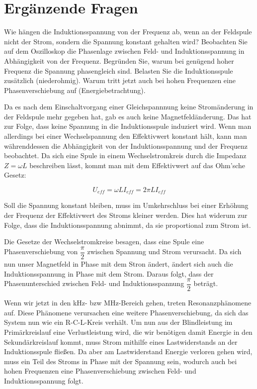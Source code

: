 \documentclass{article}
\begin{document}
\section{Ergänzende Fragen}
Wie hängen die Induktionsspannung von der Frequenz ab, wenn an der Feldspule nicht der Strom, sondern die Spannung konstant gehalten wird?
Beobachten Sie auf dem Oszilloskop die Phasenlage zwischen Feld- und Induktionsspannung in Abhängigkeit von der Frequenz.
Begründen Sie, warum bei genügend hoher Frequenz die Spannung phasengleich sind. Belasten Sie die Induktionsspule zusätzlich (niederohmig). Warum tritt jetzt auch bei hohen Frequenzen eine Phasenverschiebung auf (Energiebetrachtung).

\vspace{1cm}

Da es nach dem Einschaltvorgang einer Gleichspannnung keine Stromänderung in der Feldspule mehr gegeben hat, gab es auch keine Magnetfeldänderung. Das hat zur Folge, dass keine Spannung in die Induktionsspule induziert wird. Wenn man allerdings bei einer Wechselspannung den Effektivwert konstant hält, kann man währenddessen die Abhängigkeit von der Induktionsspannung und der Frequenz beobachtet.
Da sich eine Spule in einem Wechselstromkreis durch die Impedanz $Z=\omega L$ beschreiben lässt, kommt man mit dem Effektivwert auf das Ohm'sche Gesetz:

\begin{equation}
U_{eff}=\omega L I_{eff}=2\pi L I_{eff}
\end{equation}

Soll die Spannung konstant bleiben, muss im Umkehrschluss bei einer Erhöhung der Frequenz der Effektivwert des Stroms kleiner werden. Dies hat widerum zur Folge, dass die Induktionsspannung abnimmt, da sie proportional zum Strom ist.

Die Gesetze der Wechselstromkreise besagen, dass eine Spule eine Phasenverschiebung von $\dfrac{\pi}{2}$ zwischen Spannung und Strom verursacht. Da sich nun unser Magnetfeld in Phase mit dem Stron ändert, ändert sich auch die Induktionsspannung in Phase mit dem Strom. Daraus folgt, dass der Phasenunterschied zwischen Feld- und Induktionsspannung $\dfrac{\pi}{2}$ beträgt.

Wenn wir jetzt in den kHz- bzw MHz-Bereich gehen, treten Resonanzphänomene auf. Diese Phänomene verursachen eine weitere Phasenverschiebung, da sich das System nun wie ein R-C-L-Kreis verhält. Um nun aus der Blindleistung im Primärkreislauf eine Verlustleistung wird, die wir benötigen damit Energie in den Sekundärkreislauf kommt, muss Strom mithilfe eines Lastwiderstands an der Induktionsspule fließen. Da aber am Lastwiderstand Energie verloren gehen wird, muss ein Teil des Stroms in Phase mit der Spannung sein, wodurch auch bei hohen Frequenzen eine Phasenverschiebung zwischen Feld- und Induktionsspannung folgt.

 
\end{document}
